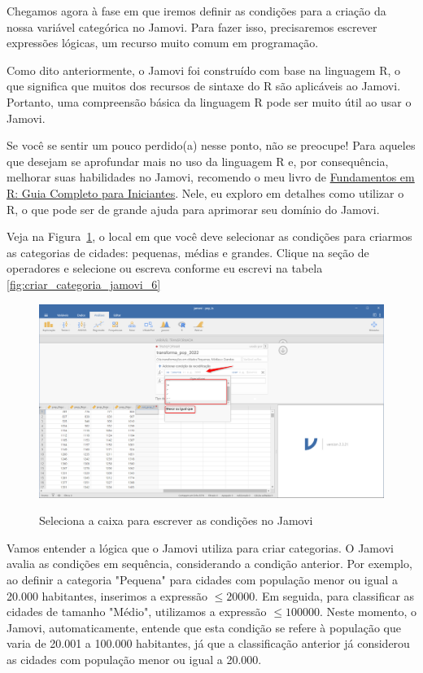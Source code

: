 Chegamos agora à fase em que iremos definir as condições para a criação da nossa variável categórica no Jamovi. Para fazer isso, precisaremos escrever expressões lógicas, um recurso muito comum em programação. 

Como dito anteriormente, o Jamovi foi construído com base na linguagem R, o que significa que muitos dos recursos de sintaxe do R são aplicáveis ao Jamovi. Portanto, uma compreensão básica da linguagem R pode ser muito útil ao usar o Jamovi.

Se você se sentir um pouco perdido(a) nesse ponto, não se preocupe! Para aqueles que desejam se aprofundar mais no uso da linguagem R e, por consequência, melhorar suas habilidades no Jamovi, recomendo o meu livro de \href{https://www.amazon.com.br/Fundamentos-Completo-Iniciantes-programa%C3%A7%C3%A3o-computa%C3%A7%C3%A3o-ebook/dp/B0B36NG18N}{Fundamentos em R: Guia Completo para Iniciantes}. Nele, eu exploro em detalhes como utilizar o R, o que pode ser de grande ajuda para aprimorar seu domínio do Jamovi.

Veja na Figura~\ref{fig:criar_categoria_jamovi_5}, o local em que você deve selecionar as condições para criarmos as categorias de cidades: pequenas, médias e grandes. Clique na seção de operadores e selecione ou escreva conforme eu escrevi na tabela \ref{fig:criar_categoria_jamovi_6}

\begin{figure}[H]
    \centering
    \caption{Seleciona a caixa para escrever as condições no Jamovi}
    \includegraphics[width=\textwidth]{imagens/cap_2/criar_categoria_jamovi_5.png}
    \label{fig:criar_categoria_jamovi_5}
\end{figure}

Vamos entender a lógica que o Jamovi utiliza para criar categorias. O Jamovi avalia as condições em sequência, considerando a condição anterior.  Por exemplo, ao definir a categoria "Pequena" para cidades com população menor ou igual a 20.000 habitantes, inserimos a expressão $\leqslant 20000$. Em seguida, para classificar as cidades de tamanho "Médio", utilizamos a expressão $\leqslant 100000$. Neste momento, o Jamovi, automaticamente, entende que esta condição se refere à população que varia de 20.001 a 100.000 habitantes, já que a classificação anterior já considerou as cidades com população menor ou igual a 20.000.

